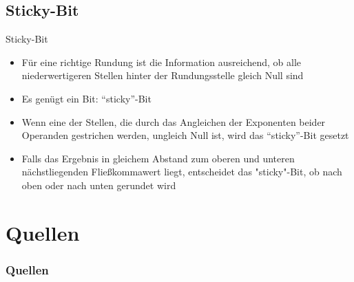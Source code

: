 \documentclass[12pt%
,xcolor=table
,aspectratio=169%
]{beamer}
\begin{document}
\subsection{Sticky-Bit}

\begin{frame}{Sticky-Bit}
\begin{itemize}
	\item Für eine richtige Rundung ist die Information ausreichend, ob alle niederwertigeren Stellen hinter der Rundungsstelle gleich Null sind
	\item Es genügt ein Bit: \enquote{sticky}-Bit
	\item Wenn eine der Stellen, die durch das Angleichen der Exponenten beider Operanden gestrichen werden, ungleich Null ist, wird das \enquote{sticky}-Bit gesetzt
	\item Falls das Ergebnis in gleichem Abstand zum oberen und unteren nächstliegenden Fließkommawert liegt, entscheidet das "sticky"-Bit, ob nach oben oder nach unten gerundet wird
\end{itemize}
\end{frame}


\section*{Quellen}
\appendix
\begin{frame}[allowframebreaks]
  \frametitle<presentation>{Quellen}
\printbibliography
\end{frame}
\end{document}
